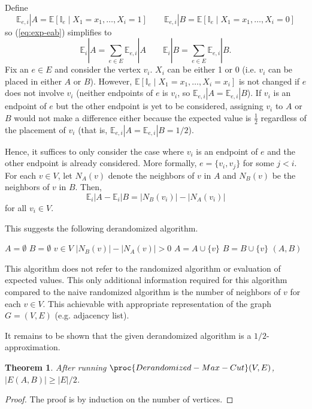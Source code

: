 \documentclass[11pt]{article}
\newcommand{\Exp}{\mathbb{E}}
\newtheorem{theorem}{Theorem}
\begin{document}
\begin{enumerate}[leftmargin=16pt]
\begin{equation}
    \end{equation}
    Define
    $$
    \Exp_{e,i} | A = \Exp[\mathbb{I}_e \mid X_1 = x_1,\ldots, X_i = 1 ] \qquad \Exp_{e,i} | B = \Exp[\mathbb{I}_e \mid X_1 = x_1,\ldots, X_i = 0 ]
    $$
    so (\ref{eq:exp-eab}) simplifies to
    \begin{equation}
        \Exp_i | A = \sum_{e \in E} \Exp_{e,i} | A \qquad \Exp_i | B = \sum_{e \in E} \Exp_{e,i} | B.
    \end{equation}
    Fix an $e \in E$ and consider the vertex $v_i$. $X_i$ can be either 1 or 0 (i.e. $v_i$ can be placed in either $A$ or $B$). However, $\Exp[\mathbb{I}_e \mid X_1 = x_1,\ldots, X_i = x_i ]$ is not changed if $e$ does not involve $v_i$ (neither endpoints of $e$ is $v_i$, so $\Exp_{e,i}|A = \Exp_{e,i} | B$). If $v_i$ is an endpoint of $e$ but the other endpoint is yet to be considered, assigning $v_i$ to $A$ or $B$ would not make a difference either because the expected value is $\frac{1}{2}$ regardless of the placement of $v_i$ (that is, $\Exp_{e,i}|A = \Exp_{e,i}|B = 1/2$).

    Hence, it suffices to only consider the case where $v_{i}$ is an endpoint of $e$ and the other endpoint is already considered. More formally, $e = \{v_i,v_j\}$ for some $j < i$. For each $v \in V$, let $N_A(v)$ denote the neighbors of $v$ in $A$ and $N_B(v)$ be the neighbors of $v$ in $B$. Then,
    $$
    \Exp_{i} | A - \Exp_{i} | B = |N_B(v_i)| - |N_A(v_i)|
    $$
    for all $v_i \in V$.

    This suggests the following derandomized algorithm.
    \begin{codebox}
        \li $A = \emptyset$
        \li $B = \emptyset$
        \li \For $v \in V$ \Do
            \li \If $|N_B(v)| - |N_A(v)| > 0$ \Then
                \li $A = A \cup \{v\}$
            \li \Else
                \li $B = B \cup \{v\}$
            \End
        \End
        \li \Return $(A,B)$ 
    \end{codebox}

    This algorithm does not refer to the randomized algorithm or evaluation of expected values. This only additional information required for this algorithm compared to the naive randomized algorithm is the number of neighbors of $v$ for each $v \in V$. This achievable with appropriate representation of the graph $G = (V,E)$ (e.g. adjacency list).

    It remains to be shown that the given derandomized algorithm is a $1/2$-approximation. 
    \begin{theorem}
        After running $\proc{Derandomized-Max-Cut}(V,E)$, $|E(A,B)| \geq |E| / 2$.
    \end{theorem}
    \begin{proof}
        The proof is by induction on the number of vertices.


\end{proof}
\end{enumerate}
\end{document}
